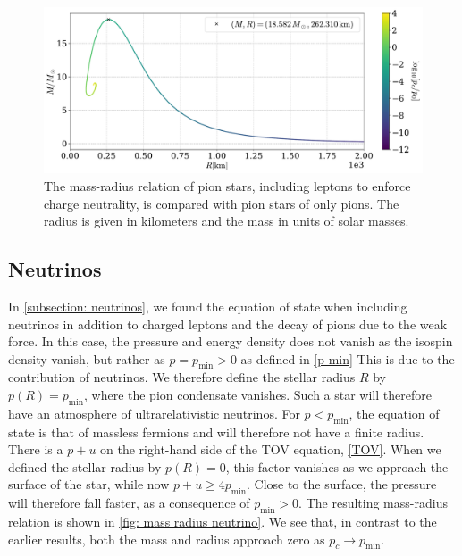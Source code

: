 \begin{figure}[!htb]
    \centering
    \includegraphics[width=\textwidth]{../scripts/figurer/pion_star/mass_radius__mu.pdf}
    \caption{
        The mass-radius relation of pion stars, including leptons to enforce charge neutrality, is compared with pion stars of only pions.
        The radius is given in kilometers and the mass in units of solar masses.
        }
        \label{fig: mass-radius relation with muons}
\end{figure}



\subsection{Neutrinos}

In \autoref{subsection: neutrinos}, we found the equation of state when including neutrinos in addition to charged leptons and the decay of pions due to the weak force.
In this case, the pressure and energy density does not vanish as the isospin density vanish, but rather as $p = p_\text{min}>0$ as defined in \autoref{p min}
This is due to the contribution of neutrinos.
We therefore define the stellar radius $R$ by $p(R) = p_\text{min}$, where the pion condensate vanishes.
Such a star will therefore have an atmosphere of ultrarelativistic neutrinos.
For $p < p_\text{min}$, the equation of state is that of massless fermions and will therefore not have a finite radius.
There is a $p+u$ on the right-hand side of the TOV equation, \autoref{TOV}.
When we defined the stellar radius by $p(R) = 0$, this factor vanishes as we approach the surface of the star, while now $p+u \geq 4 p_\text{min}$.
Close to the surface, the pressure will therefore fall faster, as a consequence of $p_\text{min}>0$.
The resulting mass-radius relation is shown in \autoref{fig: mass radius neutrino}.
We see that, in contrast to the earlier results, both the mass and radius approach zero as $p_c \rightarrow p_\text{min}$.


